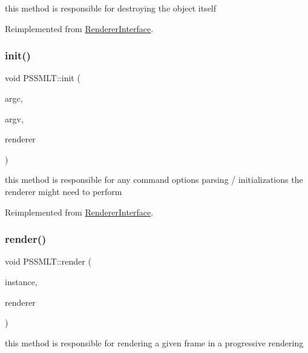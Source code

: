 this method is responsible for destroying the object itself 

Reimplemented from \hyperlink{struct_renderer_interface_a7469218aafa029a3e22bac2c00dca9f5}{Renderer\+Interface}.

\mbox{\label{struct_p_s_s_m_l_t_a77d66c7cc0d195f62cedb29c15f845bd}} 
\subsubsection{\texorpdfstring{init()}{init()}}
{\footnotesize\ttfamily void P\+S\+S\+M\+L\+T\+::init (\begin{DoxyParamCaption}\item[{int}]{argc,  }\item[{char $\ast$$\ast$}]{argv,  }\item[{\hyperlink{struct_rendering_context}{Rendering\+Context} \&}]{renderer }\end{DoxyParamCaption})\hspace{0.3cm}{\ttfamily [virtual]}}

this method is responsible for any command options parsing / initializations the renderer might need to perform 

Reimplemented from \hyperlink{struct_renderer_interface_a2ead9b943d6d48fcd32872e0005ebe63}{Renderer\+Interface}.

\mbox{\label{struct_p_s_s_m_l_t_a0eddc0de7c6a6120153f9be25b8b3a22}} 
\subsubsection{\texorpdfstring{render()}{render()}}
{\footnotesize\ttfamily void P\+S\+S\+M\+L\+T\+::render (\begin{DoxyParamCaption}\item[{const uint32}]{instance,  }\item[{\hyperlink{struct_rendering_context}{Rendering\+Context} \&}]{renderer }\end{DoxyParamCaption})\hspace{0.3cm}{\ttfamily [virtual]}}

this method is responsible for rendering a given frame in a progressive rendering


